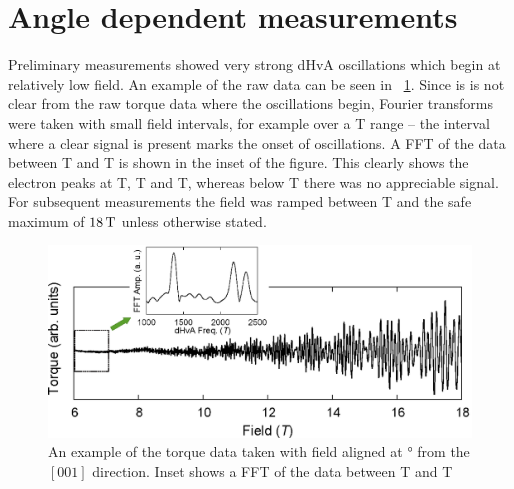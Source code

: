 
\section{Angle dependent measurements}
    \label{Sec:3:AngleDependentMeasurements}

Preliminary measurements showed very strong dHvA oscillations which begin at relatively low field.  An example of the raw data can be seen in \fig~\ref{Fig:3:RawOscillations}. Since is is not clear from the raw torque data where the oscillations begin, Fourier transforms were taken with small field intervals, for example over a \unit[1]{T} range -- the interval where a clear signal is present marks the onset of oscillations. A FFT of the data between \unit[6]{T} and \unit[7]{T} is shown in the inset of the figure. This clearly shows the electron peaks at \unit[1370]{T}, \unit[2175]{T} and \unit[2343]{T}, whereas below \unit[6]{T} there was no appreciable signal. For subsequent measurements the field was ramped between \unit[6]{T} and the safe maximum of $\unit[18]{T}$ unless otherwise stated.
\begin{figure}[h!]
    \begin{center}
        \includegraphics[scale=0.7]{Chapter3-dHvABaFe2P2/Figures/AngleDepMeasurements/RawOscillations/RawOscillations}
        \caption{An example of the torque data taken with field aligned at \unit[9]{\degree} from the $[001]$ direction. Inset shows a FFT of the data between \unit[6]{T} and \unit[7]{T}}
        \label{Fig:3:RawOscillations}
    \end{center}
\end{figure}


